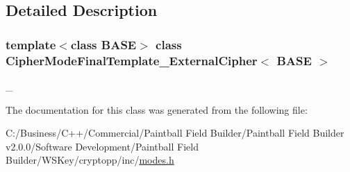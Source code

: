 \subsection{Detailed Description}
\subsubsection*{template$<$class BASE$>$ class CipherModeFinalTemplate\_\-ExternalCipher$<$ BASE $>$}

\_\- 

The documentation for this class was generated from the following file:\begin{DoxyCompactItemize}
\item 
C:/Business/C++/Commercial/Paintball Field Builder/Paintball Field Builder v2.0.0/Software Development/Paintball Field Builder/WSKey/cryptopp/inc/\hyperlink{modes_8h}{modes.h}\end{DoxyCompactItemize}

